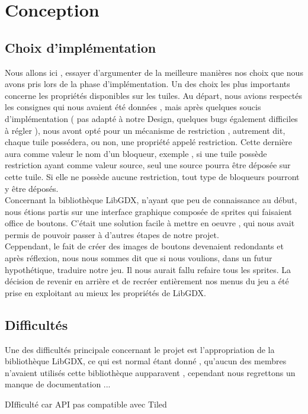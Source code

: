 \documentclass[a4paper,10pt]{article}
\begin{document}
\section{Conception}
\subsection{Choix d'implémentation}
Nous allons ici , essayer d'argumenter de la meilleure manières nos choix que nous avons pris lors de la phase d'implémentation.
Un des choix les plus importants concerne les propriétés disponibles sur les tuiles. Au départ, nous avions respectés les consignes qui nous
avaient été données , mais après quelques soucis d'implémentation ( pas adapté à notre Design, quelques bugs également difficiles à régler ), nous
avont opté pour un mécanisme de restriction , autrement dit, chaque tuile possédera, ou non, une propriété appelé restriction. Cette dernière aura
comme valeur le nom d'un bloqueur, exemple , si une tuile possède restriction ayant comme valeur source, seul une source pourra être déposée sur cette tuile.
Si elle ne possède aucune restriction, tout type de bloqueurs pourront y être déposés. 
\\
Concernant la bibliothèque LibGDX, n'ayant que peu de connaissance au début, nous étions partis sur une interface graphique composée de sprites qui faisaient
office de boutons. C'était une solution facile à mettre en oeuvre , qui nous avait permis de pouvoir passer à d'autres étapes de notre projet.\\
Ceppendant, le fait de créer des images de boutons devenaient redondants et après réflexion, nous nous sommes dit que si nous voulions, dans un futur
hypothétique, traduire notre jeu. Il nous aurait fallu refaire tous les sprites. La décision de revenir en arrière et de recréer entièrement nos menus 
du jeu a été prise en exploitant au mieux les propriétés de LibGDX. 
\subsection{Difficultés}
Une des difficultés principale concernant le projet est l'appropriation de la bibliothèque LibGDX, ce qui est normal étant donné , qu'aucun des membres
n'avaient utilisés cette bibliothèque aupparavent , cependant nous regrettons un manque de documentation ...

DIfficulté car API pas compatible avec Tiled 
\end{document}
